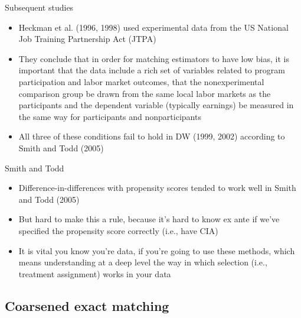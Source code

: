 \documentclass{beamer}
\begin{document}
\begin{frame}{Subsequent studies}

\begin{itemize}
\item Heckman et al. (1996, 1998) used experimental data from the US National Job Training Partnership Act (JTPA)
\item They conclude that in order for matching estimators to have low bias, it is important that the data include a rich set of variables related to program participation and labor market outcomes, that the nonexperimental comparison group be drawn from the same local labor markets as the participants and the dependent variable (typically earnings) be measured in the same way for participants and nonparticipants
\item All three of these conditions fail to hold in DW (1999, 2002) according to Smith and Todd (2005)
\end{itemize}

\end{frame}


\begin{frame}{Smith and Todd}

\begin{itemize}
\item Difference-in-differences with propensity scores tended to work well in Smith and Todd (2005)
\item But hard to make this a rule, because it's hard to know ex ante if we've specified the propensity score correctly (i.e., have CIA)
\item It is vital you know you're data, if you're going to use these methods, which means understanding at a deep level the way in which selection (i.e., treatment assignment) works in your data
\end{itemize}

\end{frame}


\subsection{Coarsened exact matching}
\end{document}

